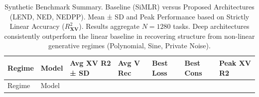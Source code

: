 \documentclass[
  letterpaper,
]{report}
\begin{document}
\begin{longtable}[]{@{}
  >{\raggedright\arraybackslash}p{}
  >{\raggedright\arraybackslash}p{}
  >{\raggedright\arraybackslash}p{}
  >{\raggedleft\arraybackslash}p{}
  >{\raggedright\arraybackslash}p{}
  >{\raggedright\arraybackslash}p{}
  >{\raggedleft\arraybackslash}p{}@{}}
\caption{Synthetic Benchmark Summary. Baseline (SiMLR) versus Proposed
Architectures (LEND, NED, NEDPP). Mean ± SD and Peak Performance based
on Strictly Linear Accuracy (\(R^2_{\mathbf{X}\mathbf{V}}\)). Results
aggregate \(N=1280\) tasks. Deep architectures consistently outperform
the linear baseline in recovering structure from non-linear generative
regimes (Polynomial, Sine, Private
Noise).}\label{tbl-synthetic-summary}\tabularnewline
\toprule\noalign{}
\begin{minipage}[b]{\linewidth}\raggedright
Regime
\end{minipage} & \begin{minipage}[b]{\linewidth}\raggedright
Model
\end{minipage} & \begin{minipage}[b]{\linewidth}\raggedright
Avg XV R2 ± SD
\end{minipage} & \begin{minipage}[b]{\linewidth}\raggedleft
Avg V Rec
\end{minipage} & \begin{minipage}[b]{\linewidth}\raggedright
Best Loss
\end{minipage} & \begin{minipage}[b]{\linewidth}\raggedright
Best Cons
\end{minipage} & \begin{minipage}[b]{\linewidth}\raggedleft
Peak XV R2
\end{minipage} \\
\midrule\noalign{}
\endfirsthead
\toprule\noalign{}
\begin{minipage}[b]{\linewidth}\raggedright
Regime
\end{minipage} & \begin{minipage}[b]{\linewidth}\raggedright
Model
\end{minipage} & \begin{minipage}[b]{\linewidth}\raggedright

\end{minipage}
\end{longtable}
\end{document}
